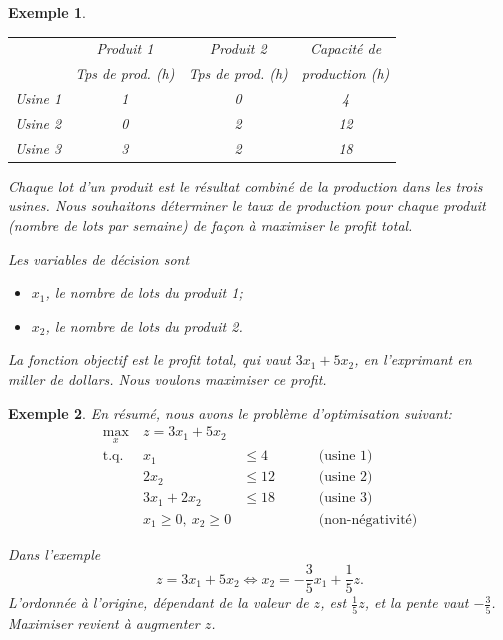 \documentclass[usepdftitle=false]{beamer}
\newtheorem{exe}{Exemple}
\begin{document}
\begin{frame}

\begin{exe}

\begin{center}
\begin{tabular}{|c|c|c|c|}
\hline
& Produit 1 & Produit 2 & Capacité de \\
& Tps de prod. (h) & Tps de prod. (h)& production (h)\\
\hline
Usine 1 & 1 & 0 & 4 \\
\hline
Usine 2 & 0 & 2 & 12 \\
\hline
Usine 3 & 3 & 2 & 18 \\
\hline
\end{tabular}
\end{center}

Chaque lot d'un produit est le résultat combiné de la production dans les trois usines.
Nous souhaitons déterminer le taux de production pour chaque produit (nombre de lots par semaine) de façon à maximiser le profit total.

Les variables de décision sont
\begin{itemize}
\item
$x_1$, le nombre de lots du produit 1;
\item
$x_2$, le nombre de lots du produit 2.
\end{itemize}
La fonction objectif est le profit total, qui vaut $3x_1 +5x_2$, en l'exprimant en miller de dollars. Nous voulons maximiser ce profit.
\end{exe}

\end{frame}

\begin{frame}

\begin{exe}
En résumé, nous avons le problème d'optimisation suivant:
\begin{align*}
\max_x\ & z = 3x_1 + 5x_2 & & \\
\mbox{t.q. } & x_1 & \leq 4 & \qquad \mbox{ (usine 1)} \\
& 2x_2 & \leq 12 & \qquad \mbox{ (usine 2)} \\
& 3x_1 + 2x_2 & \leq 18 & \qquad \mbox{ (usine 3)} \\
& x_1 \geq 0,\ x_2 \geq 0 & & \qquad \mbox{ (non-négativité)}
\end{align*}

Dans l'exemple
\[
z = 3x_1+5x_2 \Leftrightarrow x_2 = -\frac{3}{5}x_1 + \frac{1}{5}z.
\]
L'ordonnée à l'origine, dépendant de la valeur de $z$, est $\frac{1}{5}z$, et la pente vaut $-\frac{3}{5}$.
Maximiser revient à augmenter $z$.
\end{exe}

\end{frame}
\end{document}
